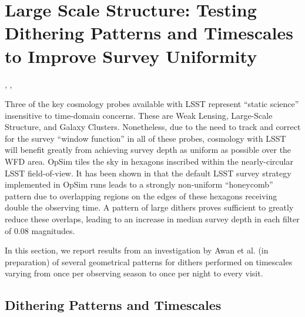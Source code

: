 %
%
%

\section{Large Scale Structure:  Testing Dithering Patterns and Timescales to Improve Survey Uniformity}
\def\secname{lss}\label{sec:\secname}

,
,

Three of the key cosmology probes available with LSST represent ``static
science'' insensitive to time-domain concerns.  These are Weak Lensing,
Large-Scale Structure, and Galaxy Clusters.  Nonetheless, due to the
need to track and correct for the survey ``window function'' in all of
these probes, cosmology with LSST will benefit greatly from achieving
survey depth as uniform as possible over the WFD area.  OpSim tiles the
sky in hexagons inscribed within the nearly-circular LSST field-of-view.
It has been shown in \citet{CarrollEtal2014} that the default LSST
survey strategy implemented in OpSim runs leads to a strongly
non-uniform ``honeycomb'' pattern due to overlapping regions on the
edges of these hexagons receiving double the observing time.  A pattern
of large dithers proves sufficient to greatly reduce these overlaps,
leading to an increase in median survey depth in each filter of 0.08
magnitudes.

In this section, we report results from an investigation by Awan et al.
(in preparation) of several geometrical patterns for dithers performed
on timescales varying from once per observing season to once per night
to every visit.



\subsection{Dithering Patterns and Timescales}
\label{sec:\secname:strategies}



